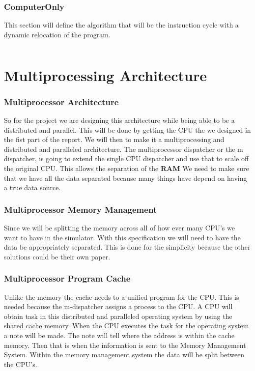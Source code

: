 \documentclass{report}
\begin{document}
\section{ComputerOnly}
This section will define the algorithm that will be the instruction cycle with a dynamic relocation of the program.
\begin{lstlisting}
\end{lstlisting}

\part{Multiprocessing Architecture}
\section{Multiprocessor Architecture}
So for the project we are designing this architecture while being able to be a distributed and parallel.
This will be done by getting the CPU the we designed in the fist part of the report.
We will then to make it a multiprocessing and distributed and paralleled architecture.
The multiprocessor dispatcher or the m dispatcher, is going to extend the single CPU dispatcher and use that to scale off the original CPU.
This allows the separation of the \textbf{RAM}
We need to make sure that we have all the data separated because many things have depend on having a true data source.

\section{Multiprocessor Memory Management}
Since we will be splitting the memory across all of how ever many CPU's we want to have in the simulator.
With this specification we will need to have the data be appropriately separated.
This is done for the simplicity because the other solutions could be their own paper.
\section{Multiprocessor Program Cache}
Unlike the memory the cache needs to a unified program for the CPU.
This is needed because the m-dispatcher assigns a process to the CPU.
A CPU will obtain task in this distributed and paralleled operating system by using the shared cache memory.
When the CPU executes the task for the operating system a note will be made.
The note will tell where the address is within the cache memory.
Then that is when the information is sent to the Memory Management System.
Within the memory management system the data will be split between the CPU's.
\end{document}
